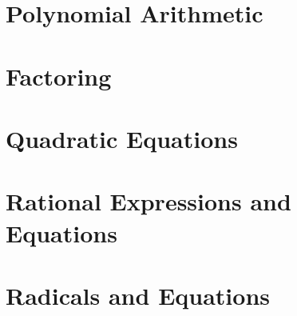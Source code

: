 

\newpage

\section{Polynomial Arithmetic}



\newpage

\section{Factoring}



\newpage

\section{Quadratic Equations}



\newpage

\section{Rational Expressions and Equations}



\newpage

\section{Radicals and Equations}



\newpage

